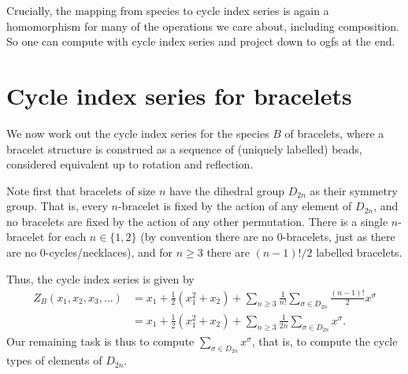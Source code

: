 \documentclass{article}
\begin{document}
Crucially, the mapping from species to cycle index series is again a
homomorphism for many of the operations we care about, including
composition.  So one can compute with cycle index series and project
down to ogfs at the end.

\section{Cycle index series for bracelets}
\label{sec:bracelet-cycle-index}

We now work out the cycle index series for the species $B$ of
bracelets, where a bracelet structure is construed as a sequence of
(uniquely labelled) beads, considered equivalent up to rotation and
reflection.

Note first that bracelets of size $n$ have the dihedral group $D_{2n}$
as their symmetry group.  That is, every $n$-bracelet is fixed by the
action of any element of $D_{2n}$, and no bracelets are fixed by the
action of any other permutation.  There is a single $n$-bracelet for
each $n \in \{1,2\}$ (by convention there are no $0$-bracelets, just
as there are no $0$-cycles/necklaces), and for $n \geq 3$ there are
$(n-1)!/2$ labelled bracelets.

Thus, the cycle index series is given by
\begin{align*}
Z_B(x_1, x_2, x_3, \dots)
&= x_1 + \frac{1}{2}(x_1^2 + x_2) + \sum_{n \geq 3} \frac{1}{n!}
\sum_{\sigma \in D_{2n}} \frac{(n-1)!}{2} x^\sigma \\
&= x_1 + \frac{1}{2}(x_1^2 + x_2) + \sum_{n \geq 3}
\frac{1}{2n} \sum_{\sigma \in D_{2n}} x^\sigma.
\end{align*}
Our remaining task is thus to compute $\sum_{\sigma \in D_{2n}}
x^\sigma$, that is, to compute the cycle types of elements of
$D_{2n}$.
\end{document}
